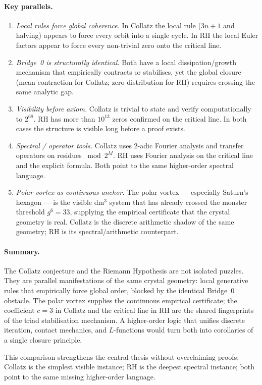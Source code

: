 \paragraph{Key parallels.}

\begin{enumerate}
  \item \emph{Local rules force global coherence.}
        In Collatz the local rule ($3n+1$ and halving) appears to force every orbit into a single cycle.
        In RH the local Euler factors appear to force every non-trivial zero onto the critical line.

  \item \emph{Bridge~0 is structurally identical.}
        Both have a local dissipation/growth mechanism that empirically contracts or stabilises, yet the global closure (mean contraction for Collatz; zero distribution for RH) requires crossing the same analytic gap.

  \item \emph{Visibility before axiom.}
        Collatz is trivial to state and verify computationally to $2^{68}$.
        RH has more than $10^{13}$ zeros confirmed on the critical line.
        In both cases the structure is visible long before a proof exists.

  \item \emph{Spectral / operator tools.}
        Collatz uses 2-adic Fourier analysis and transfer operators on residues $\bmod 2^M$.
        RH uses Fourier analysis on the critical line and the explicit formula.
        Both point to the same higher-order spectral language.

  \item \emph{Polar vortex as continuous anchor.}
        The polar vortex — especially Saturn's hexagon — is the visible dm$^3$ system that has already crossed the monster threshold $g^6=33$,
        supplying the empirical certificate that the crystal geometry is real.
        Collatz is the discrete arithmetic shadow of the same geometry; RH is its spectral/arithmetic counterpart.
\end{enumerate}

\paragraph{Summary.}

The Collatz conjecture and the Riemann Hypothesis are not isolated puzzles.
They are parallel manifestations of the same crystal geometry: local generative rules that
empirically force global order, blocked by the identical Bridge~0 obstacle.
The polar vortex supplies the continuous empirical certificate; the coefficient $c=3$ in
Collatz and the critical line in RH are the shared fingerprints of the triad stabilisation
mechanism.
A higher-order logic that unifies discrete iteration, contact mechanics, and $L$-functions
would turn both into corollaries of a single closure principle.

This comparison strengthens the central thesis without overclaiming proofs:
Collatz is the simplest visible instance; RH is the deepest spectral instance;
both point to the same missing higher-order language.
